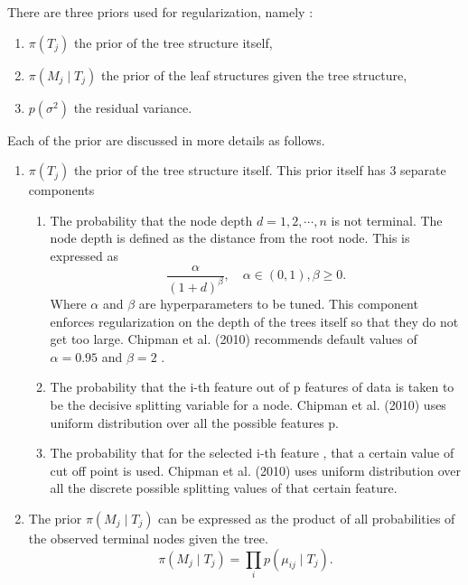 \documentclass{usiinftr}
\begin{document}
There are three priors used for regularization, namely \cite{7}:
\begin{enumerate}
\item $\pi(T_j)$ the prior of the tree structure itself,
\item $\pi(M_j \mid T_j)$ the prior of the leaf structures given the tree structure, 
\item $p(\sigma^2)$ the residual variance.
\end{enumerate}

Each of the prior are discussed in more details as follows.
\begin{enumerate}
\item $\pi(T_j)$ the prior of the tree structure itself. This prior itself has 3 separate components
			\begin{enumerate}
				\item The probability that the node depth $d = 1,2,\cdots,n$ is not terminal. The node depth is defined as the distance from the root node. This is expressed as 
			\begin{equation}\frac{\alpha}{(1+d)^{\beta}}, \quad \alpha \in (0,1), \beta \geq 0 . \end{equation}
			Where $\alpha$ and $\beta$ are hyperparameters to be tuned. This component enforces regularization on the depth of the trees itself so that they do not get too large. Chipman et al. (2010) recommends default values of $\alpha = 0.95$ and $\beta =2$ \cite{7}.
				\item The probability that the i-th feature out of p features of data is taken to be the decisive splitting variable for a node. Chipman et al. (2010) \cite{7} uses uniform distribution over all the possible features p.
				\item The probability that for the selected i-th feature , that a certain value of cut off point is used. Chipman et al. (2010) \cite{7} uses uniform distribution over all the discrete possible splitting values of that certain feature.
			\end{enumerate} 
\item The prior $\pi(M_j \mid T_j)$ can be expressed as the product of all probabilities of the observed terminal nodes given the tree.
\begin{equation}\pi(M_j \mid T_j) = \prod_i p(\mu_{ij} \mid T_j). \end{equation}


\end{enumerate}
\end{document}
